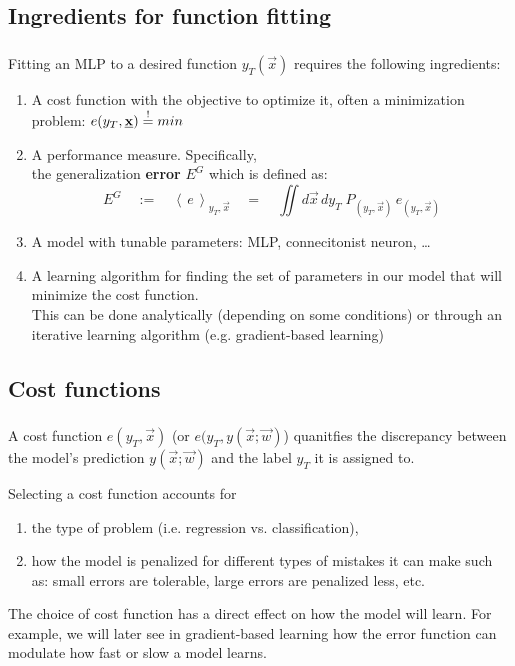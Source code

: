 \subsection{Ingredients for function fitting}

\begin{frame}\frametitle{\subsecname}


Fitting an MLP to a desired function $y_T(\vec x)$ requires the following ingredients:

\begin{enumerate}
\item A cost function with the objective to optimize it, often a minimization problem: $e(y_T, \underline{\mathbf{x}}) \stackrel{\mathrm{!}}{=} min$
\item A performance measure. Specifically, \\

the generalization \textbf{error} $E^G$ which is defined as:	
\begin{equation} 
			E^G \quad := \quad \left<\,e\,\right>_{y_T, \vec{x}} 
			\quad = \quad \iint d \vec{x} \, dy_T \; 
				P_{(y_T, \vec{x})} \, e_{(y_T, \vec{x})}
\end{equation}

\item A model with tunable parameters: MLP, connecitonist neuron, \ldots
\item A learning algorithm for finding the set of parameters in our model that will minimize the cost function.\\
This can be done analytically (depending on some conditions) or through an iterative learning algorithm (e.g. gradient-based learning)
\end{enumerate}

\end{frame}

\subsection{Cost functions}
\begin{frame}\frametitle{\subsecname}

A cost function $e(y_T, \vec x)$ (or $e(y_T, y(\vec x; \vec w)$) quanitfies the discrepancy between the model's prediction $y(\vec x; \vec w)$ and the label $y_T$ it is assigned to.

Selecting a cost function accounts for 
\begin{enumerate}
\item the type of problem (i.e. regression vs. classification), 
\item how the model is penalized for different types of mistakes it can make such as:
small errors are tolerable, large errors are penalized less, etc.
\end{enumerate}

The choice of cost function has a direct effect on how the model will learn. For example, we will later see in gradient-based learning how the error function can modulate how fast or slow a model learns.

\end{frame}

